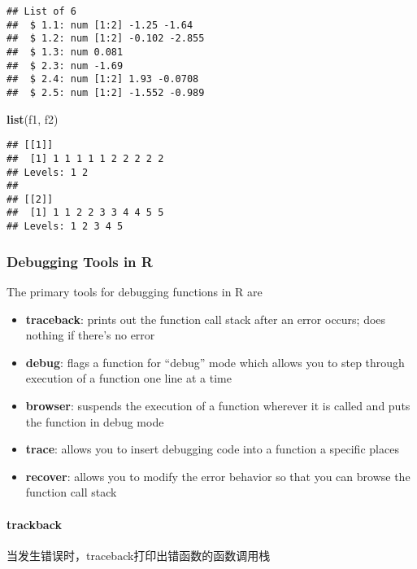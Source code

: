 \documentclass[
]{article}
\newenvironment{Shaded}{\begin{snugshade}}{\end{snugshade}}
\newcommand{\KeywordTok}[1]{\textcolor[rgb]{0.13,0.29,0.53}{\textbf{#1}}}
\newcommand{\NormalTok}[1]{#1}
\providecommand{\tightlist}{%
  \setlength{\itemsep}{0pt}\setlength{\parskip}{0pt}}
\begin{document}
\begin{verbatim}
## List of 6
##  $ 1.1: num [1:2] -1.25 -1.64
##  $ 1.2: num [1:2] -0.102 -2.855
##  $ 1.3: num 0.081
##  $ 2.3: num -1.69
##  $ 2.4: num [1:2] 1.93 -0.0708
##  $ 2.5: num [1:2] -1.552 -0.989
\end{verbatim}

\begin{Shaded}
\begin{Highlighting}[]
\KeywordTok{list}\NormalTok{(f1, f2)}
\end{Highlighting}
\end{Shaded}

\begin{verbatim}
## [[1]]
##  [1] 1 1 1 1 1 2 2 2 2 2
## Levels: 1 2
## 
## [[2]]
##  [1] 1 1 2 2 3 3 4 4 5 5
## Levels: 1 2 3 4 5
\end{verbatim}

\hypertarget{debugging-tools-in-r}{%
\subsubsection{Debugging Tools in R}\label{debugging-tools-in-r}}

The primary tools for debugging functions in R are

\begin{itemize}
\tightlist
\item
  \textbf{traceback}: prints out the function call stack after an error
  occurs; does nothing if there's no error
\item
  \textbf{debug}: flags a function for ``debug'' mode which allows you
  to step through execution of a function one line at a time
\item
  \textbf{browser}: suspends the execution of a function wherever it is
  called and puts the function in debug mode
\item
  \textbf{trace}: allows you to insert debugging code into a function a
  specific places
\item
  \textbf{recover}: allows you to modify the error behavior so that you
  can browse the function call stack
\end{itemize}

\hypertarget{trackback}{%
\paragraph{trackback}\label{trackback}}

当发生错误时，traceback打印出错函数的函数调用栈
\end{document}
